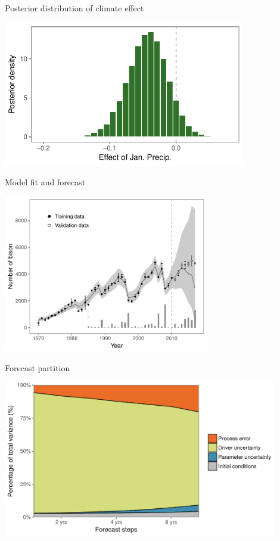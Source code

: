 \documentclass[14pt, compress, aspectratio=1610]{beamer}
\begin{document}
\begin{frame}{%
\protect\hypertarget{posterior-distribution-of-climate-effect}{%
Posterior distribution of climate effect}}

\centering

\includegraphics[height = 2.5in]{./figures/bison_post_params.pdf}

\end{frame}

\begin{frame}{%
\protect\hypertarget{model-fit-and-forecast}{%
Model fit and forecast}}

\centering

\includegraphics[height=2.7in]{./figures/bison_fit.pdf}

\end{frame}

\begin{frame}{%
\protect\hypertarget{forecast-partition}{%
Forecast partition}}

\centering

\includegraphics[height=2.7in]{./figures/forecast_partition.pdf}

\end{frame}
\end{document}

